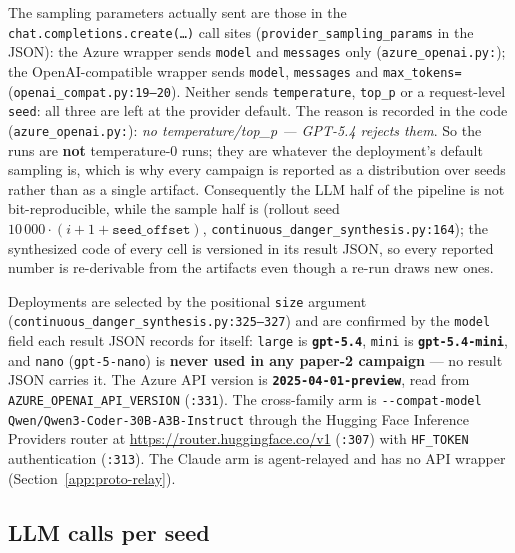 The sampling parameters actually sent are those in the
\texttt{chat.\allowbreak completions.\allowbreak create(\dots)\allowbreak } call sites
(\texttt{provider\_\allowbreak sampling\_\allowbreak params} in the JSON): the Azure wrapper sends
\texttt{model} and \texttt{messages} only (\texttt{azure\_\allowbreak openai.\allowbreak py:}); the
OpenAI-compatible wrapper sends \texttt{model}, \texttt{messages} and
\texttt{max\_\allowbreak tokens=} (\texttt{openai\_\allowbreak compat.\allowbreak py:19--20}). Neither sends
\texttt{temperature}, \texttt{top\_p} or a request-level \texttt{seed}: all three
are left at the provider default. The reason is recorded in the code
(\texttt{azure\_\allowbreak openai.\allowbreak py:}): \emph{no temperature/top\_p --- GPT-5.4 rejects
them}. So the runs are \textbf{not} temperature-$0$ runs; they are whatever the
deployment's default sampling is, which is why every campaign is reported as a
distribution over seeds rather than as a single artifact. Consequently the LLM
half of the pipeline is not bit-reproducible, while the sample half is (rollout
seed $10\,000 \cdot (i + 1 + \texttt{seed\_offset})$,
\texttt{continuous\_\allowbreak danger\_\allowbreak synthesis.\allowbreak py:164}); the synthesized code of every
cell is versioned in its result JSON, so every reported number is re-derivable
from the artifacts even though a re-run draws new ones.

Deployments are selected by the positional \texttt{size} argument
(\texttt{continuous\_\allowbreak danger\_\allowbreak synthesis.\allowbreak py:325--327}) and are confirmed by the
\texttt{model} field each result JSON records for itself: \texttt{large} is
\textbf{\texttt{gpt-5.4}}, \texttt{mini} is \textbf{\texttt{gpt-5.4-mini}}, and
\texttt{nano} (\texttt{gpt-5-nano}) is \textbf{never used in any paper-2
campaign} --- no result JSON carries it. The Azure API version is
\textbf{\texttt{2025-04-01-preview}}, read from \texttt{AZURE\_\allowbreak OPENAI\_\allowbreak API\_\allowbreak VERSION}
(\texttt{:331}). The cross-family arm is
\texttt{-{}-compat-model Qwen/Qwen3-Coder-30B-A3B-Instruct} through the Hugging
Face Inference Providers router at \url{https://router.huggingface.co/v1}
(\texttt{:307}) with \texttt{HF\_TOKEN} authentication (\texttt{:313}). The
Claude arm is agent-relayed and has no API wrapper
(Section~\ref{app:proto-relay}).

\subsection{LLM calls per seed}
\label{app:proto-calls}

